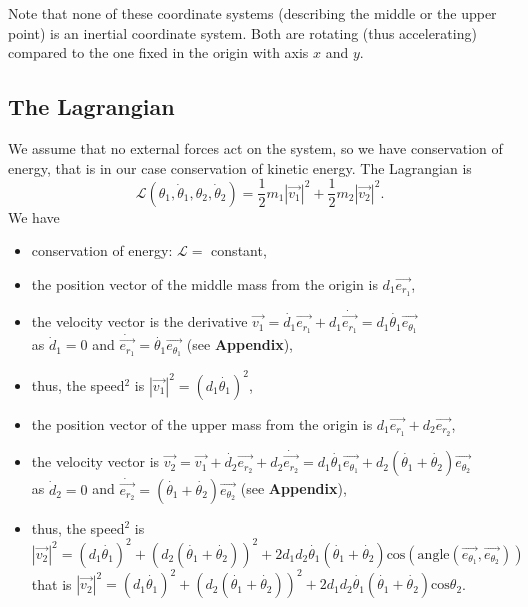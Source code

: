 \documentclass[12pt]{article}
\renewcommand{\vec}[1]{\ensuremath{\overrightarrow{#1}}}
\begin{document}
Note that none of these coordinate systems (describing the middle or the upper point) is an inertial coordinate system. Both are rotating (thus accelerating) compared to the one fixed in the origin with axis $x$ and $y$.

\newpage

\subsection*{The Lagrangian}
We assume that no external forces act on the system, so we have conservation of energy, that is in our case conservation of kinetic energy.
The Lagrangian is
$$\mathcal{L}(\theta_1, \dot \theta_1, \theta_2, \dot \theta_2) = \frac{1}{2} m_1 |\vec{v_1}|^2 + \frac{1}{2} m_2 |\vec{v_2}|^2.$$
\vspace{1ex}
\noindent
We have
\begin{itemize}\itemsep 0.7ex
 \item conservation of energy: $\mathcal{L} = $ constant,
 \item the position vector of the middle mass from the origin is $d_1 \vec{e_{r_1}}$,
 \item the velocity vector is the derivative $\vec{v_1} = \dot{d_1} \vec{e_{r_1}} + d_1 \dot{\vec{e_{r_1}}} = d_1 \dot{\theta_1} \vec{e_{\theta_1}}$\\
 as $\dot d_1 = 0$ and $\dot{\vec{e_{r_1}}} = \dot{\theta_1} \vec{e_{\theta_1}}$ (see {\bf Appendix}),
 \item thus, the speed$^2$ is $|\vec{v_1}|^2 = (d_1 \dot{\theta_1})^2$,
 \item the position vector of the upper mass from the origin is $d_1 \vec{e_{r_1}} + d_2 \vec{e_{r_2}}$,
 \item the velocity vector is $\vec{v_2} = \vec{v_1} + \dot{d_2} \vec{e_{r_2}} + d_2 \dot{\vec{e_{r_2}}} = d_1 \dot{\theta_1} \vec{e_{\theta_1}} + d_2 (\dot{\theta_1} + \dot{\theta_2}) \vec{e_{\theta_2}}$\\
 as $\dot d_2 = 0$ and $\dot{\vec{e_{r_2}}} = (\dot{\theta_1} + \dot{\theta_2}) \vec{e_{\theta_2}}$  (see {\bf Appendix}),
 \item thus, the speed$^2$ is $|\vec{v_2}|^2 = (d_1 \dot{\theta_1})^2 + (d_2 (\dot{\theta_1} + \dot{\theta_2}))^2 + 2 d_1 d_2 \dot{\theta_1} (\dot{\theta_1} + \dot{\theta_2}) \mathrm{cos}(\mathrm{angle}(\vec{e_{\theta_1}}, \vec{e_{\theta_2}}))$\\
 that is $|\vec{v_2}|^2 = (d_1 \dot{\theta_1})^2 + (d_2 (\dot{\theta_1} + \dot{\theta_2}))^2 + 2 d_1 d_2 \dot{\theta_1} (\dot{\theta_1} + \dot{\theta_2}) \mathrm{cos}\theta_2$.
\end{itemize}
\end{document}
